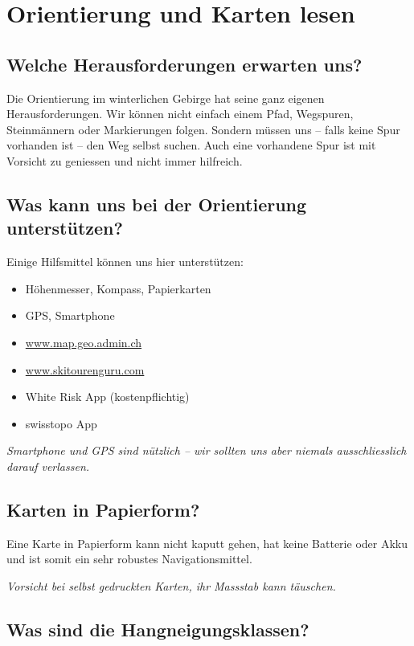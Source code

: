 \section{Orientierung und Karten lesen}

\subsection{Welche Herausforderungen erwarten uns?}

Die Orientierung im winterlichen Gebirge hat seine ganz eigenen Herausforderungen.
Wir können nicht einfach einem Pfad, Wegspuren, Steinmännern oder Markierungen folgen.
Sondern müssen uns -- falls keine Spur vorhanden ist -- den Weg selbst suchen.
Auch eine vorhandene Spur ist mit Vorsicht zu geniessen und nicht immer hilfreich.

\subsection{Was kann uns bei der Orientierung unterstützen?}

Einige Hilfsmittel können uns hier unterstützen:

\begin{itemize}
  \item{Höhenmesser, Kompass, Papierkarten}
  \item{GPS, Smartphone}
  \item{\href{https://s.geo.admin.ch/y34y7btkqsvz}{www.map.geo.admin.ch}}
  \item{\href{https://www.skitourenguru.com//}{www.skitourenguru.com}}
  \item{White Risk App (kostenpflichtig)}
  \item{swisstopo App}
\end{itemize}

\textit{Smartphone und GPS sind nützlich -- wir sollten uns aber niemals ausschliesslich darauf verlassen.}

\subsection{Karten in Papierform?}

Eine Karte in Papierform kann nicht kaputt gehen, hat keine Batterie oder Akku und ist somit ein sehr robustes Navigationsmittel.

\textit{Vorsicht bei selbst gedruckten Karten, ihr Massstab kann täuschen.}

\subsection{Was sind die Hangneigungsklassen?}

